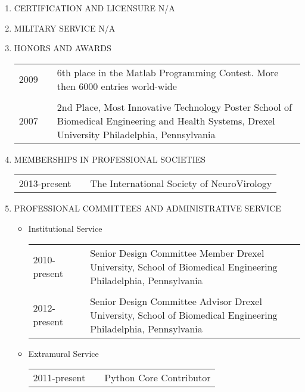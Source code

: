 \documentclass[a4paper,10pt]{article}
\begin{document}
\begin{enumerate}
\begin{longtable}{p{}p{}p{}}
 \end{longtable}
 \item CERTIFICATION AND LICENSURE \newline
 N/A
 \item MILITARY SERVICE \newline
 N/A
 \item HONORS AND AWARDS
 \begin{longtable}{p{}p{}p{}}
  2009 & & 6th place in the Matlab Programming Contest. \newline More then 6000 entries world-wide\\
  \\
  2007 & & 2nd Place, Most Innovative Technology Poster \newline School of Biomedical Engineering and Health Systems, Drexel University \newline Philadelphia, Pennsylvania\\
  \end{longtable}
 \item MEMBERSHIPS IN PROFESSIONAL SOCIETIES
  \begin{longtable}{p{}p{}p{}}
  2013-present & & The International Society of NeuroVirology\\
  \end{longtable}
 \item PROFESSIONAL COMMITTEES AND ADMINISTRATIVE SERVICE
 \begin{itemize}
  \item[] Institutional Service
  \begin{longtable}{p{}p{}p{}}
  2010-present & & Senior Design Committee Member \newline Drexel University, School of Biomedical Engineering \newline Philadelphia, Pennsylvania \\
  \\
  2012-present & & Senior Design Committee Advisor \newline Drexel University, School of Biomedical Engineering \newline Philadelphia, Pennsylvania \\
  \end{longtable}
  \item[] Extramural Service
  \begin{longtable}{p{}p{}p{}}
  2011-present & & Python Core Contributor \\

\end{longtable}
\end{itemize}
\end{enumerate}
\end{document}
